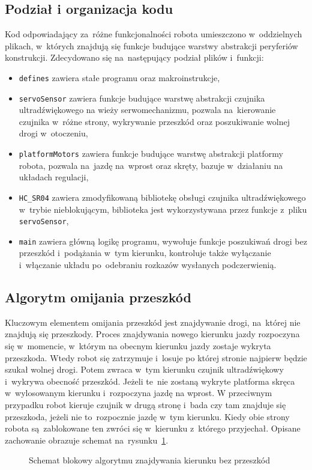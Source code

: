 \documentclass[11pt]{article}
\begin{document}
\subsection{Podział i organizacja kodu}
Kod odpowiadający za~różne funkcjonalności robota umieszczono w~oddzielnych plikach, w~których znajdują się funkcje budujące warstwy abstrakcji peryferiów konstrukcji. Zdecydowano się na~następujący podział plików i~funkcji:
\begin{itemize}
	\item \texttt{defines} zawiera stałe programu oraz makroinstrukcje,
	\item \texttt{servoSensor} zawiera funkcje budujące warstwę abstrakcji czujnika ultradźwiękowego na wieży serwomechanizmu, pozwala na~kierowanie czujnika w~różne strony, wykrywanie przeszkód oraz poszukiwanie wolnej drogi w~otoczeniu,
	\item \texttt{platformMotors} zawiera funkcje budujące warstwę abstrakcji platformy robota, pozwala na~jazdę na~wprost oraz skręty, bazuje w~działaniu na układach regulacji,
	\item \verb|HC_SR04| zawiera zmodyfikowaną bibliotekę obsługi czujnika ultradźwiękowego w~trybie nieblokującym, biblioteka jest wykorzystywana przez funkcje z~pliku \texttt{servoSensor},
	\item \texttt{main} zawiera główną logikę programu, wywołuje funkcje poszukiwań drogi bez przeszkód i~podążania w~tym kierunku, kontroluje także wyłączanie i~włączanie układu po~odebraniu rozkazów wysłanych podczerwienią.
\end{itemize}

\subsection{Algorytm omijania przeszkód}
Kluczowym elementem omijania przeszkód jest znajdywanie drogi, na~której nie znajdują się przeszkody.
Proces znajdywania nowego kierunku jazdy rozpoczyna się w~momencie, w~którym na obecnym kierunku jazdy zostaje wykryta przeszkoda.
Wtedy robot się zatrzymuje i~losuje po której stronie najpierw będzie szukał wolnej drogi. Potem zwraca w~tym kierunku czujnik ultradźwiękowy i~wykrywa obecność przeszkód.
Jeżeli te~nie zostaną wykryte platforma skręca w~wylosowanym kierunku i~rozpoczyna jazdę na wprost.
W przeciwnym przypadku robot kieruje czujnik w drugą stronę i~bada czy tam znajduje się przeszkoda, jeżeli nie to~rozpocznie jazdę w~tym kierunku.
Kiedy obie strony robota są~zablokowane ten zwróci się w~kierunku z~którego przyjechał. Opisane zachowanie obrazuje schemat na~rysunku~\ref{fig:tikz:pathfind_flowchart}.
\begin{figure}[htbp]
	\centering
	\scalebox{0.8}{}
	\caption{Schemat blokowy algorytmu znajdywania kierunku bez przeszkód}
	\label{fig:tikz:pathfind_flowchart}
\end{figure}
\end{document}
